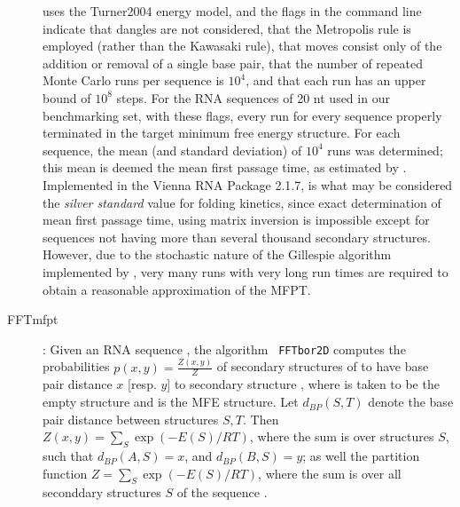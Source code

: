 \begin{description}
\begin{quote}
\end{quote}
 uses the Turner2004 energy model, and the flags in
the command line indicate that dangles are not considered, that the
Metropolis rule is employed (rather than the Kawasaki rule), that
moves consist only of the addition or removal of a single base pair,
that the number of repeated Monte Carlo runs per sequence is $10^4$,
and that each run has an upper bound of $10^8$ steps. For the RNA
sequences of 20 nt used in our benchmarking set, with these flags,
every run for every sequence properly terminated in the target minimum
free energy structure. For each sequence, the mean (and standard
deviation) of $10^4$ runs was determined; this mean is deemed the mean
first passage time, as estimated by \kinfold. Implemented in the
Vienna RNA Package 2.1.7, \kinfold is what may be considered the
{\em silver standard} value for folding kinetics, since exact
determination of mean first passage time, using matrix inversion is
impossible except for sequences not having more than several thousand
secondary structures. However, due to the stochastic nature of the
Gillespie algorithm implemented by \kinfold, very many runs with
very long run times are required to obtain a reasonable approximation
of the MFPT.

\item[FFTmfpt]: Given an RNA sequence \seq, the algorithm {\tt
FFTbor2D} \cite{Senter.jmb14} computes the probabilities $p(x,y) =
\frac{Z(x,y)}{Z}$ of secondary structures of \seq to have base pair
distance $x$ [resp. $y$] to secondary structure , where
\strA is taken to be the empty structure and \strB is the MFE structure.
Let $d_{BP}(S,T)$ denote the base pair distance between structures
$S,T$. Then $Z(x,y) = \sum_S \exp(-E(S)/RT)$, where the sum is over
structures $S$, such that $d_{BP}(A,S)=x$, and $d_{BP}(B,S)=y$; as
well the partition function $Z =\sum_S \exp(-E(S)/RT)$, where the sum
is over all seconddary structures $S$ of the sequence \seq.


\end{description}
